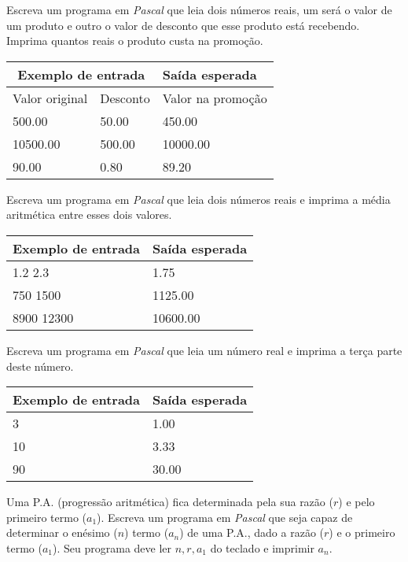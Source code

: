 \item Escreva um programa em \emph{Pascal} que leia dois números reais, um 
será o valor de um produto e outro o valor de desconto que esse produto está 
recebendo. Imprima quantos reais o produto custa na promoção.

\begin{center}
\begin{tabular}{|l|l|l|} \hline
\multicolumn{2}{|c|}{Exemplo de entrada} & Saída esperada \\ \hline
Valor original & Desconto & Valor na promoção \\ \hline
500.00         & 50.00  & 450.00 \\ \hline
10500.00       & 500.00 & 10000.00\\ \hline
90.00          & 0.80   & 89.20 \\ \hline
\end{tabular}
\end{center}

\item Escreva um programa em \emph{Pascal} que leia dois números reais e 
imprima a média aritmética entre esses dois valores.

\begin{center}
\begin{tabular}{|l|l|} \hline
Exemplo de entrada & Saída esperada \\ \hline
1.2 2.3         & 1.75 \\ \hline
750 1500        & 1125.00  \\ \hline
8900 12300      & 10600.00 \\ \hline
\end{tabular}
\end{center}

\item Escreva um programa em \emph{Pascal} que leia um número real e imprima a 
terça parte deste número.

\begin{center}
\begin{tabular}{|l|l|} \hline
Exemplo de entrada & Saída esperada \\ \hline
3               & 1.00 \\ \hline
10              & 3.33  \\ \hline
90              & 30.00 \\ \hline
\end{tabular}
\end{center}

\item Uma P.A. (progressão aritmética) fica determinada pela sua razão ($r$) 
e pelo primeiro termo ($a_1$). Escreva um programa em \emph{Pascal} que seja 
capaz de determinar o enésimo ($n$) termo ($a_n$) de uma P.A., dado a razão 
($r$) e o primeiro termo ($a_1$). Seu programa deve ler $n, r, a_1$ do teclado
e imprimir $a_n$.

